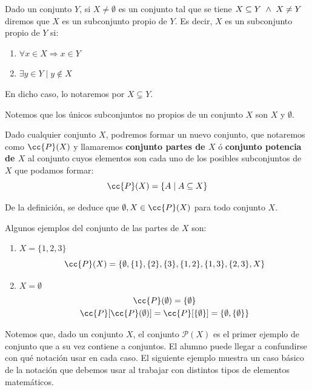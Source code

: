 \begin{definicion}
    Dado un conjunto $Y$, si $X \neq \emptyset$ es un conjunto tal que se tiene $X \subseteq Y \ \land \  X \neq Y$ diremos que $X$ es un subconjunto propio de $Y$.
    Es decir, $X$ es un subconjunto propio de $Y$ si:
    \begin{enumerate}
        \item $\forall x \in X \Rightarrow x \in Y$
        \item $\exists y \in Y \mid y \notin X$
    \end{enumerate}
    
    En dicho caso, lo notaremos por $X \subsetneq Y$.
\end{definicion}
Notemos que los únicos subconjuntos no propios de un conjunto $X$ son $X$ y $\emptyset $.

\begin{definicion}
    Dado cualquier conjunto $X$, podremos formar un nuevo conjunto, que notaremos como $\cc{P}(X)$ y llamaremos \textbf{conjunto partes de $X$} ó \textbf{conjunto potencia de $X$} al conjunto cuyos elementos son cada uno de los posibles subconjuntos de $X$ que podamos formar:
    $$\cc{P}(X) = \{A \mid A \subseteq X\}$$
\end{definicion}
De la definición, se deduce que $\emptyset,X\in \cc{P}(X)$ para todo conjunto $X$.

\begin{ejemplo} Algunos ejemplos del conjunto de las partes de $X$ son:
\begin{enumerate}
    \item $X = \{1, 2, 3\}$
    $$\cc{P}(X) = \{\emptyset, \{1\}, \{2\}, \{3\}, \{1, 2\}, \{1, 3\}, \{2, 3\}, X\}$$

    \item $X=\emptyset$
    \begin{gather*}
        \cc{P}(\emptyset)=\{\emptyset\}\\
        \cc{P}[\cc{P}(\emptyset)] = \cc{P}[\{\emptyset\}] = \{\emptyset, \{\emptyset\}\}
    \end{gather*}
\end{enumerate}
\end{ejemplo}

Notemos que, dado un conjunto $X$, el conjunto $\mathcal{P}(X)$ es el primer ejemplo de conjunto que a su vez contiene a conjuntos. El alumno puede llegar a confundirse con qué notación usar en cada caso. El siguiente ejemplo muestra un caso básico de la notación que debemos usar al trabajar con distintos tipos de elementos matemáticos.

